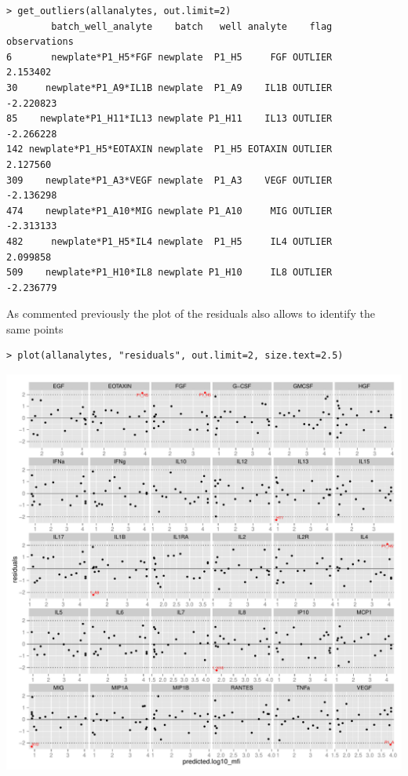 \documentclass[11pt]{article}\usepackage[]{graphicx}\usepackage[]{color}
\makeatletter
\def\maxwidth{ %
  \ifdim\Gin@nat@width>\linewidth
    \linewidth
  \else
    \Gin@nat@width
  \fi
}
\newenvironment{kframe}{%
 \def\at@end@of@kframe{}%
 \ifinner\ifhmode%
  \def\at@end@of@kframe{\end{minipage}}%
  \begin{minipage}{\columnwidth}%
 \fi\fi%
 \def\FrameCommand##1{\hskip\@totalleftmargin \hskip-\fboxsep
 \colorbox{shadecolor}{##1}\hskip-\fboxsep
     \hskip-\linewidth \hskip-\@totalleftmargin \hskip\columnwidth}%
 \MakeFramed {\advance\hsize-\width
   \@totalleftmargin\z@ \linewidth\hsize
   \@setminipage}}%
 {\par\unskip\endMakeFramed%
 \at@end@of@kframe}
\newenvironment{knitrout}{}{} %
\makeatother
\begin{document}
\begin{knitrout}
\color{fgcolor}\begin{kframe}
\begin{verbatim}
> get_outliers(allanalytes, out.limit=2)
        batch_well_analyte    batch   well analyte    flag observations
6       newplate*P1_H5*FGF newplate  P1_H5     FGF OUTLIER     2.153402
30     newplate*P1_A9*IL1B newplate  P1_A9    IL1B OUTLIER    -2.220823
85    newplate*P1_H11*IL13 newplate P1_H11    IL13 OUTLIER    -2.266228
142 newplate*P1_H5*EOTAXIN newplate  P1_H5 EOTAXIN OUTLIER     2.127560
309    newplate*P1_A3*VEGF newplate  P1_A3    VEGF OUTLIER    -2.136298
474    newplate*P1_A10*MIG newplate P1_A10     MIG OUTLIER    -2.313133
482     newplate*P1_H5*IL4 newplate  P1_H5     IL4 OUTLIER     2.099858
509    newplate*P1_H10*IL8 newplate P1_H10     IL8 OUTLIER    -2.236779
\end{verbatim}
\end{kframe}
\end{knitrout}

\noindent As commented previously the plot of the residuals also allows to 
identify the same points

\begin{knitrout}
\color{fgcolor}\begin{kframe}
\begin{verbatim}
> plot(allanalytes, "residuals", out.limit=2, size.text=2.5)
\end{verbatim}
\end{kframe}

{\centering \includegraphics[width=\maxwidth]{./unnamed-chunk-53-1} 

}



\end{knitrout}
\end{document}

